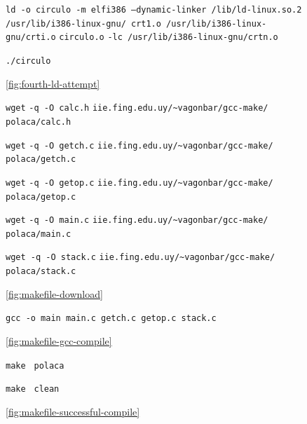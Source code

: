 \documentclass[11pt]{article}
\newcommand{\codetext}[2]{\large\texttt{\textcolor{#1}{#2}}}
\newcommand{\imagecaption}[1]{\vspace{-7pt}\caption*{\char91\ref{fig:#1}\char93}}
\begin{document}
		\begin{figure}[H]
			\centering
			\begin{code-box}
				\codetext{light-blue}{ld }\codetext{orange-desert-vim}{-o circulo -m elf\textunderscore\/i386 --dynamic-linker /lib/ld-linux.so.2 /usr/lib/i386-linux-gnu/ crt1.o /usr/lib/i386-linux-gnu/crti.o} \codetext{light-red}{circulo.o} \codetext{orange-desert-vim}{-lc /usr/lib/i386-linux-gnu/crtn.o}
				
				\codetext{light-blue}{./circulo}
			\end{code-box}
			\imagecaption{fourth-ld-attempt}
		\end{figure}
		
		\begin{figure}[H]
			\centering
			\begin{code-box}
				\codetext{light-blue}{wget} \codetext{orange-desert-vim}{-q -O calc.h} \codetext{light-red}{iie.fing.edu.uy/\textasciitilde{}vagonbar/gcc-make/ polaca/calc.h}
				
				\codetext{light-blue}{wget} \codetext{orange-desert-vim}{-q -O getch.c} \codetext{light-red}{iie.fing.edu.uy/\textasciitilde{}vagonbar/gcc-make/ polaca/getch.c}
				
			  	\codetext{light-blue}{wget} \codetext{orange-desert-vim}{-q -O getop.c} \codetext{light-red}{iie.fing.edu.uy/\textasciitilde{}vagonbar/gcc-make/ polaca/getop.c}
				
				\codetext{light-blue}{wget} \codetext{orange-desert-vim}{-q -O  main.c} \codetext{light-red}{iie.fing.edu.uy/\textasciitilde{}vagonbar/gcc-make/ polaca/main.c}
				
				\codetext{light-blue}{wget }\codetext{orange-desert-vim}{-q -O stack.c} \codetext{light-red}{iie.fing.edu.uy/\textasciitilde{}vagonbar/gcc-make/ polaca/stack.c}
			
			\end{code-box}
			\imagecaption{makefile-download}
		\end{figure}
		
		\begin{figure}[H]
			\centering
			\begin{code-box}
				\codetext{light-blue}{gcc }\codetext{orange-desert-vim}{-o main }\codetext{light-red}{main.c getch.c getop.c stack.c}
			\end{code-box}
			\imagecaption{makefile-gcc-compile}
		\end{figure}
		
		\begin{figure}[H]
			\centering
			\begin{code-box}
				\codetext{light-blue}{make } \codetext{light-red}{polaca}
                
                		\codetext{light-blue}{make } \codetext{light-red}{clean}

			\end{code-box}
			\imagecaption{makefile-successful-compile}
		\end{figure}
		
\end{document}

